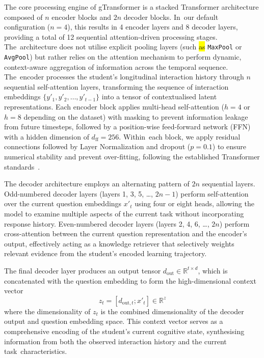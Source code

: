 \documentclass[applsci,article,accept,moreauthors,pdftex]{Definitions/mdpi}
\begin{document}
{The core processing engine of gTransformer is a stacked Transformer architecture composed of $n$ encoder blocks and $2n$ decoder blocks. In~our default configuration ($n=4$), this results in 4 encoder layers and 8 decoder layers, providing a total of 12 sequential attention-driven processing stages. The~architecture does not utilise explicit pooling layers (such \hl{as} %
 \texttt{MaxPool} or \texttt{AvgPool}) but rather relies on the attention mechanism to perform dynamic, context-aware aggregation of information across the temporal sequence. The~encoder processes the student's longitudinal interaction history through $n$ sequential self-attention layers, transforming the sequence of interaction embeddings $\{y'_1, y'_2, \ldots, y'_{t-1}\}$ into a tensor of contextualised latent representations. Each encoder block applies multi-head self-attention ($h=4$ or $h=8$ depending on the dataset) with masking to prevent information leakage from future timesteps, followed by a position-wise feed-forward network (FFN) with a hidden dimension of $d_{\text{ff}} = 256$. Within~each block, we apply residual connections followed by Layer Normalization and dropout ($p=0.1$) to ensure numerical stability and prevent over-fitting, following the established Transformer standards~\citep{vaswani2017attention}.}

{The decoder architecture employs an alternating pattern of $2n$ sequential layers. Odd-numbered decoder layers (layers 1, 3, 5, \dots, $2n-1$) perform self-attention over the current question embeddings $x'_t$ using four or eight heads, allowing the model to examine multiple aspects of the current task without incorporating response history. Even-numbered decoder layers (layers 2, 4, 6, \dots, $2n$) perform cross-attention between the current question representation and the encoder's output, effectively acting as a knowledge retriever that selectively weights relevant evidence from the student's encoded learning trajectory.}

The final decoder layer produces an output tensor $d_{\text{out}} \in \mathbb{R}^{t \times d}$, which is concatenated with the question embedding to form the high-dimensional context vector
\begin{equation} \label{eq:context_vector}
    z_t = [d_{\text{out},t}; x'_t] \in \mathbb{R}^{z}
\end{equation}
where the dimensionality of $z_t$ is the combined dimensionality of the decoder output and question embedding space. This context vector serves as a comprehensive encoding of the student's current cognitive state, {synthesising} information from both the observed interaction history and the current task~characteristics.
\end{document}
